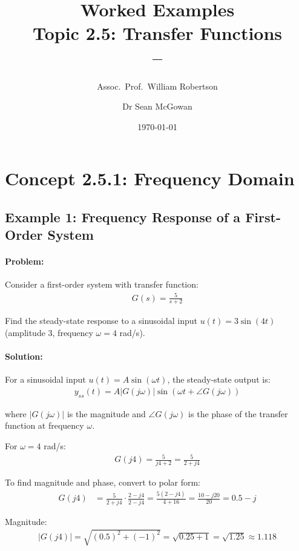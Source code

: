 \documentclass[11pt,a4paper]{article}
\title{\textbf{Worked Examples}\\[0.5em]
\large Topic 2.5: Transfer Functions\\[0.3em]
\normalsize \coursesubtitle{} -- \coursetitle}
\author{Assoc.\ Prof.\ William Robertson \and Dr Sean McGowan}
\date{\today}
\begin{document}
\maketitle
\tableofcontents
\newpage

\section{Concept 2.5.1: Frequency Domain}

\subsection{Example 1: Frequency Response of a First-Order System}

\paragraph{Problem:} Consider a first-order system with transfer function:
\begin{align}
G(s) = \frac{5}{s+2}
\end{align}

Find the steady-state response to a sinusoidal input $u(t) = 3\sin(4t)$ (amplitude 3, frequency $\omega = 4$ rad/s).

\paragraph{Solution:}

For a sinusoidal input $u(t) = A\sin(\omega t)$, the steady-state output is:
\begin{align}
y_{ss}(t) = A|G(j\omega)|\sin(\omega t + \angle G(j\omega))
\end{align}

where $|G(j\omega)|$ is the magnitude and $\angle G(j\omega)$ is the phase of the transfer function at frequency $\omega$.

For $\omega = 4$ rad/s:
\begin{align}
G(j4) = \frac{5}{j4+2} = \frac{5}{2+j4}
\end{align}

To find magnitude and phase, convert to polar form:
\begin{align}
G(j4) &= \frac{5}{2+j4} \cdot \frac{2-j4}{2-j4} = \frac{5(2-j4)}{4+16} = \frac{10-j20}{20} = 0.5 - j
\end{align}

Magnitude:
\begin{align}
|G(j4)| = \sqrt{(0.5)^2 + (-1)^2} = \sqrt{0.25 + 1} = \sqrt{1.25} \approx 1.118
\end{align}
\end{document}
